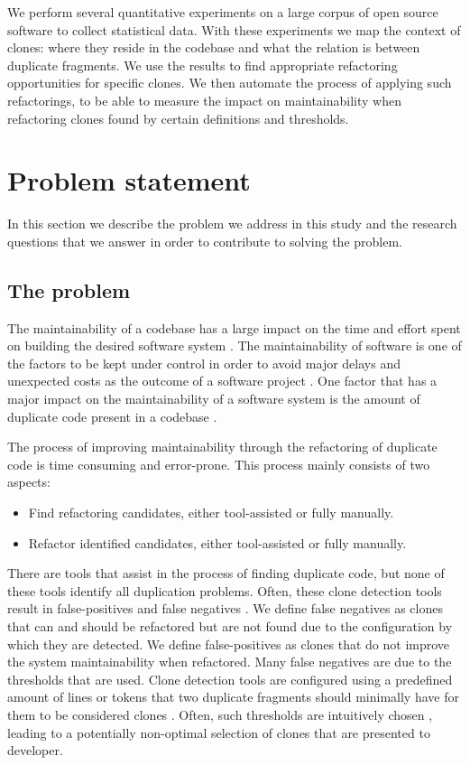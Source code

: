 We perform several quantitative experiments on a large corpus of open source software to collect statistical data. With these experiments we map the context of clones: where they reside in the codebase and what the relation is between duplicate fragments. We use the results to find appropriate refactoring opportunities for specific clones. We then automate the process of applying such refactorings, to be able to measure the impact on maintainability when refactoring clones found by certain definitions and thresholds.

\section{Problem statement}
In this section we describe the problem we address in this study and the research questions that we answer in order to contribute to solving the problem.

\subsection{The problem}
The maintainability of a codebase has a large impact on the time and effort spent on building the desired software system \cite{bakota2012cost, munson1978software}. The maintainability of software is one of the factors to be kept under control in order to avoid major delays and unexpected costs as the outcome of a software project \cite{fowler2018refactoring}. One factor that has a major impact on the maintainability of a software system is the amount of duplicate code present in a codebase \cite{heitlager2007practical, fowler1999refactoring}.

The process of improving maintainability through the refactoring of duplicate code is time consuming and error-prone. This process mainly consists of two aspects:
\begin{itemize}
	\item Find refactoring candidates, either tool-assisted or fully manually.
	\item Refactor identified candidates, either tool-assisted or fully manually.
\end{itemize}
There are tools that assist in the process of finding duplicate code, but none of these tools identify all duplication problems. Often, these clone detection tools result in false-positives and false negatives \cite{roy2007survey}. We define false negatives as clones that can and should be refactored but are not found due to the configuration by which they are detected. We define false-positives as clones that do not improve the system maintainability when refactored. Many false negatives are due to the thresholds that are used. Clone detection tools are configured using a predefined amount of lines or tokens that two duplicate fragments should minimally have for them to be considered clones \cite{sajnani2016sourcerercc, svajlenko2016bigcloneeval}. Often, such thresholds are intuitively chosen \cite{li2006cp, roy2009mutation}, leading to a potentially non-optimal selection of clones that are presented to developer.


